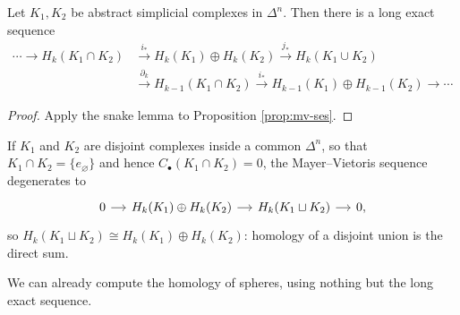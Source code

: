 \begin{theorem} \label{thm:mv}
	Let $K_1, K_2$ be abstract simplicial complexes in $\Delta^n$. Then there is a long exact sequence
	\begin{align*}
		\cdots \to H_k(K_1\cap K_2) &\xrightarrow{\ i_*\ } H_k(K_1)\oplus H_k(K_2) \xrightarrow{\ j_*\ } H_k(K_1\cup K_2) \\
		&\xrightarrow{\ \partial_k\ } H_{k-1}(K_1\cap K_2) \xrightarrow{\ i_*\ } H_{k-1}(K_1)\oplus H_{k-1}(K_2) \to \cdots
	\end{align*}
\end{theorem}
\begin{proof}
	Apply the snake lemma to Proposition \ref{prop:mv-ses}.
\end{proof}

\begin{example} \label{ex:disjoint}
	If $K_1$ and $K_2$ are disjoint complexes inside a common $\Delta^n$, so that $K_1 \cap K_2 = \{e_\varnothing\}$ and hence $C_\bullet(K_1\cap K_2) = 0$, the Mayer--Vietoris sequence degenerates to
	\[\begin{tikzcd}[column sep=small]
		0 \arrow[r] & {H_k(K_1)\oplus H_k(K_2)} \arrow[r] & {H_k(K_1\sqcup K_2)} \arrow[r] & 0,
	\end{tikzcd}\]
	so $H_k(K_1\sqcup K_2) \cong H_k(K_1)\oplus H_k(K_2)$: homology of a disjoint union is the direct sum.
\end{example}

We can already compute the homology of spheres, using nothing but the long exact
sequence.

